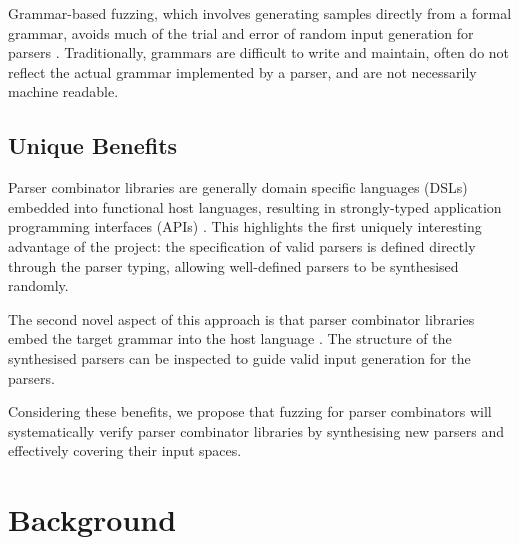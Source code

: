 \documentclass{article}
\begin{document}
Grammar-based fuzzing, which involves generating samples directly from a formal grammar, avoids much of the trial and error of random input generation for parsers \cite{grammar}. Traditionally, grammars are difficult to write and maintain, often do not reflect the actual grammar implemented by a parser, and are not necessarily machine readable.

\subsection{Unique Benefits} %
Parser combinator libraries are generally domain specific languages (DSLs) embedded into functional host languages, resulting in strongly-typed application programming interfaces (APIs) \cite{monadic-combinators, parsec}. This highlights the first uniquely interesting advantage of the project: the specification of valid parsers is defined directly through the parser typing, allowing well-defined parsers to be synthesised randomly.

The second novel aspect of this approach is that parser combinator libraries embed the target grammar into the host language \cite{combinator-parsing}. The structure of the synthesised parsers can be inspected to guide valid input generation for the parsers.

Considering these benefits, we propose that fuzzing for parser combinators will systematically verify parser combinator libraries by synthesising new parsers and effectively covering their input spaces.

\section{Background} %
\end{document}
